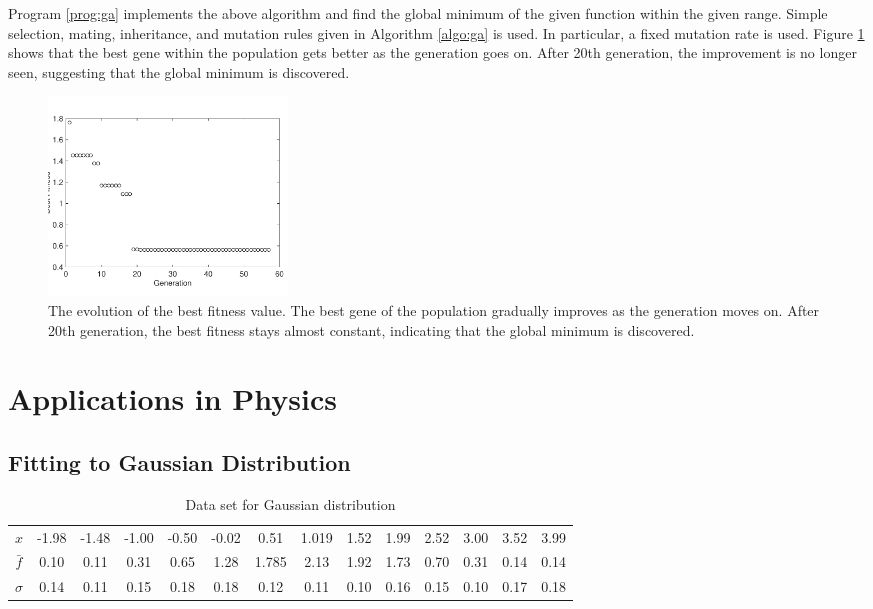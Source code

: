 \begin{example}
Program \ref{prog:ga} implements the above algorithm and find the global minimum of the given function within the given range.  Simple selection, mating, inheritance, and mutation rules given in Algorithm \ref{algo:ga} is used. In particular, a fixed mutation rate is used.
Figure \ref{fig:ga} shows that the best gene within the population gets better as the generation goes on. After 20th generation, the improvement is no longer seen, suggesting that the global minimum is discovered.

\begin{figure}
\centering
\includegraphics[width=2.5in]{19.Optimization/ga_evolution.pdf}
\caption{The evolution of the best fitness value.  The best gene of the population gradually improves as the generation moves on.  After 20th generation, the best fitness stays almost constant, indicating that the global minimum is discovered.} 
\label{fig:ga}
\end{figure}

\end{example}

\noindent
\section{Applications in Physics}

\noindent
\subsection{Fitting to Gaussian Distribution}\label{ex:ga_gauss}

\begin{table}
\centering
\caption{Data set for Gaussian distribution}\label{tbl:Gaussian}
\begin{tabular}{c|ccccccccccccc}
\hline
$x$&-1.98&-1.48&-1.00&-0.50&-0.02&0.51&1.019&1.52&1.99&2.52&3.00&3.52&3.99\\
$\bar{f}$&0.10&0.11&0.31&0.65&1.28&1.785&2.13&1.92&1.73&0.70&0.31&0.14&0.14\\
$\sigma$&0.14&0.11&0.15&0.18&0.18&0.12&0.11&0.10&0.16&0.15&0.10&0.17&0.18\\
\hline
\end{tabular}
\end{table}

